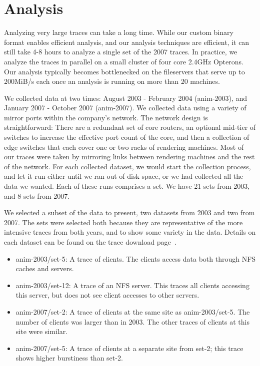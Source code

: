 \section{Analysis}
\label{sec:analysis}

Analyzing very large traces can take a long time.  While our custom
binary format enables efficient analysis, and our analysis techniques
are efficient, it can still take 4-8 hours to analyze a single set of
the 2007 traces.  In practice, we analyze the traces in parallel on a
small cluster of four core 2.4GHz Opterons.  Our analysis typically
becomes bottlenecked on the fileservers that serve up to 200MiB/s each
once an analysis is running on more than 20 machines.

We collected data at two times: August 2003 - February 2004 (anim-2003), and January 2007 - October 2007
(anim-2007).  We collected data using a variety of mirror
ports within the company's network.
The network design is
straightforward: There are a redundant set of core routers, an
optional mid-tier of switches to increase the effective port count of
the core, and then a collection of edge switches that each cover one
or two racks of rendering machines.  Most of our traces were taken by
mirroring links between rendering machines and the rest of the network.
For each collected dataset, we would start the collection
process, and let it run either until we ran out of disk space, or we
had collected all the data we wanted.  Each of these runs comprises a
set.  We have 21 sets from 2003, and 8 sets from 2007. 

We selected a subset of the data to present, two datasets from 2003
and two from 2007.  The sets were selected both because they are
representative of the more intensive traces from both years, and to
show some variety in the data.  Details on each dataset can be found
on the trace download page~\cite{animation-bear-traces}.

\begin{itemize}
\item{anim-2003/set-5}: A trace of clients.  The clients access data
both through NFS caches and servers.

\item{anim-2003/set-12}: A trace of an NFS server.  This traces all clients
accessing this server, but does not see client accesses to other servers.

\item{anim-2007/set-2}: A trace of clients at the same site as
anim-2003/set-5.  The number of clients was larger than in 2003.  The
other traces of clients at this site were similar.

\item{anim-2007/set-5}: A trace of clients at a separate site from
set-2; this trace shows higher burstiness than set-2.
\end{itemize}

